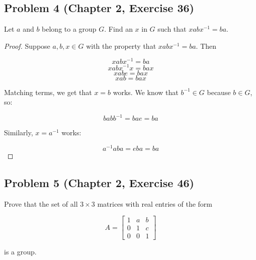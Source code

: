 \documentclass{article}
\begin{document}
\subsection*{Problem 4 (Chapter 2, Exercise 36)}
Let $a$ and $b$ belong to a group $G$. Find an $x$ in $G$ such that $xabx^{-1} = ba$.

\begin{proof}
Suppose $a, b, x \in G$ with the property that $xabx^{-1} = ba$. Then

\[ xabx^{-1} = ba \]
\[ xabx^{-1}x = bax \]
\[ xabe = bax \]
\[ xab = bax \]

Matching terms, we get that $x=b$ works. We know that $b^{-1} \in G$ because $b \in G$, so:

\[ babb^{-1} = bae = ba \]

Similarly, $x=a^{-1}$ works:

\[ a^{-1}aba = eba = ba \]


\end{proof}


\subsection*{Problem 5 (Chapter 2, Exercise 46)}
Prove that the set of all $3 \times 3$ matrices with real entries of the form

\[A = \begin{bmatrix}
1 & a & b \\
0 & 1 & c \\
0 & 0 & 1
\end{bmatrix} \]

is a group.
\end{document}
